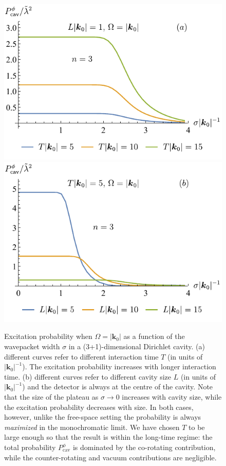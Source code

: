 \documentclass[11pt,prd,onecolumn,superscriptaddress,nofootinbib,floatfix,amsmath,amssymb]{revtex4-2}
\newcommand{\bk}{{\bm{k}}}
\begin{document}
    \begin{figure}[htp]
        \centering
        \includegraphics[scale=0.95]{Fig2a.pdf}
        \includegraphics[scale=0.95]{Fig2b.pdf}
        \caption{Excitation probability when $\Omega=|\bk_0|$ as a function of the wavepacket width $\sigma$ in a (3+1)-dimensional Dirichlet cavity. {(a)} different curves refer to different interaction time $T$ (in units of $|\bk_0|^{-1}$). The excitation probability increases with longer interaction time. {(b)} different curves refer to different cavity size $L$ (in units of $|\bk_0|^{-1}$) and the detector is always at the centre of the cavity. Note that the size of the plateau as $\sigma\to 0$ increases with cavity size, while the excitation probability decreases with size. In both cases, however, unlike the free-space setting the probability is always \textit{maximized} in the monochromatic limit. We have chosen $T$ to be large enough so that the result is within the long-time regime: the total probability $P_{\text{cav}}^\phi$ is dominated by the co-rotating contribution, while the counter-rotating and vacuum contributions are negligible. }
        \label{fig: resonant-cavity-peak-limit}
    \end{figure}
\end{document}
